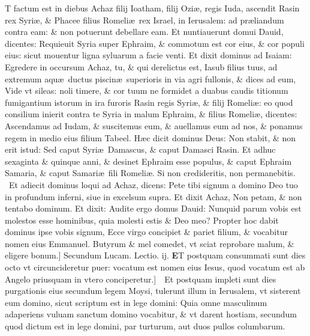 \documentclass[a5paper,10pt]{book}
\def\leftmarginnote{%
	\lrmarginnote{\hskip -\marginparsep \hskip -6.5em}}
\def\rightmarginnote{%
	\lrmarginnote{\hskip\columnwidth \hskip -1em}}
\def\ae{æ}
\begin{document}
\begin{multicols*}{2}
\fancyhead[C]{\color{red} Feria. v. Dominic\ae . j. aduentus}
\vspace{-.5em}
T\rightmarginnote{ca. 7.} factum est in diebus Achaz filij Ioatham, filij Ozi\ae , regis Iuda, ascendit Rasin rex Syri\ae , \& Phacee filius Romeli\ae \ rex Israel, in Ierusalem: ad pr\ae liandum contra eam: \& non potuerunt debellare eam.
Et nuntiauerunt domui Dauid, dicentes: Requieuit Syria super Ephraim, \& commotum est cor eius, \& cor populi eius: sicut mouentur ligna syluarum a facie venti.
Et dixit dominus ad Isaiam: Egredere in occursum Achaz, tu, \& qui derelictus est, Iasub filius tuus, ad extremum aqu\ae \ ductus piscin\ae \ superioris in via agri fullonis, \& dices ad eum, Vide vt sileas: noli timere, \& cor tuum ne formidet a duabus caudis titionum fumigantium istorum in ira furoris Rasin regis Syri\ae , \& filij Romeli\ae : eo quod consilium inierit contra te Syria in malum Ephraim, \& filius Romeli\ae , dicentes: Ascendamus ad Iudam, \& suscitemus eum, \& auellamus eum ad nos, \& ponamus regem in medio eius filium Tabeel.
H\ae c dicit dominus Deus: Non stabit, \& non erit istud:
Sed caput Syri\ae \ Damascus, \& caput Damasci Rasin.
Et adhuc sexaginta \& quinque anni, \& desinet Ephraim esse populus, \& caput Ephraim Samaria, \& caput Samari\ae \ fili Romeli\ae .
Si non credideritis, non permanebitis. \textdagger \ 
Et\leftmarginnote{\begin{flushright}B\end{flushright}} adiecit dominus loqui ad Achaz, dicens: Pete tibi signum a domino Deo tuo in profundum inferni, siue in excelsum supra. Et dixit Achaz, Non petam, \& non tentabo dominum.
Et dixit: Audite ergo domus Dauid: Nunquid parum vobis est molestos esse hominibus, quia molesti estis \& Deo meo?
Propter hoc dabit dominus ipse vobis signum, Ecce virgo concipiet \& pariet filium, \& vocabitur nomen eius Emmanuel.
Butyrum \& mel comedet, vt sciat reprobare malum, \& eligere bonum.]
\newline \color{red} Secundum Lucam. \hfill Lectio. ij. \color{black}
\vspace{-.5em}
\lettrine[lines=2]{\bfseries \color{red} E}{}\textdagger T\leftmarginnote{\begin{flushright}c.2.c\end{flushright}} postquam consummati sunt dies octo vt circuncideretur puer: vocatum est nomen eius Iesus, quod vocatum est ab Angelo priusquam in vtero conciperetur.]\ \textdagger \ 
Et\leftmarginnote{\begin{flushright}D\end{flushright}} postquam impleti sunt dies purgationis eius secundum legem Moysi, tulerunt illum in Ierusalem, vt sisterent eum domino, sicut scriptum est in lege domini: Quia omne masculinum adaperiens vuluam sanctum domino vocabitur, \& vt darent hostiam, secundum quod dictum est in lege domini, par turturum, aut duos pullos columbarum.

\end{multicols*}
\end{document}
